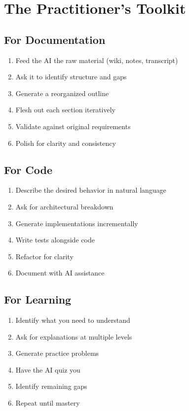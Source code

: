 \chapter{The Practitioner's Toolkit}

\section{For Documentation}

\begin{enumerate}
    \item Feed the AI the raw material (wiki, notes, transcript)
    \item Ask it to identify structure and gaps
    \item Generate a reorganized outline
    \item Flesh out each section iteratively
    \item Validate against original requirements
    \item Polish for clarity and consistency
\end{enumerate}

\section{For Code}

\begin{enumerate}
    \item Describe the desired behavior in natural language
    \item Ask for architectural breakdown
    \item Generate implementations incrementally
    \item Write tests alongside code
    \item Refactor for clarity
    \item Document with AI assistance
\end{enumerate}

\section{For Learning}

\begin{enumerate}
    \item Identify what you need to understand
    \item Ask for explanations at multiple levels
    \item Generate practice problems
    \item Have the AI quiz you
    \item Identify remaining gaps
    \item Repeat until mastery
\end{enumerate}

